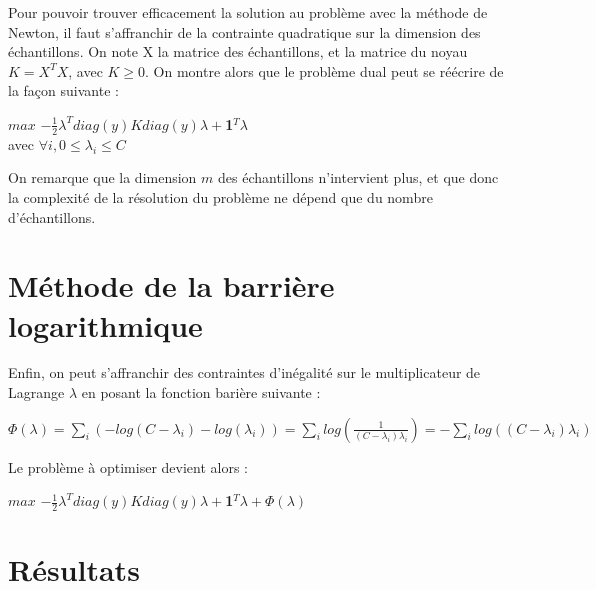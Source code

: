 \documentclass{article}
\begin{document}
Pour pouvoir trouver efficacement la solution au problème avec la méthode de Newton, il faut s'affranchir de la contrainte quadratique sur la dimension des échantillons. On note X la matrice des échantillons, et la matrice du noyau $K = X^TX$, avec $K \geq 0$. On montre alors que le problème dual peut se réécrire de la façon suivante :\\

                 \begin{center}
                 $max$ $-\frac{1}{2}\lambda^Tdiag(y)Kdiag(y)\lambda+$\textbf{1}$^T\lambda$\\
                 avec $\forall i, 0 \leq \lambda_i \leq C$ 
                 \end{center}

On remarque que la dimension $m$ des échantillons n'intervient plus, et que donc la complexité de la résolution du problème ne dépend que du nombre d'échantillons. 

\section{Méthode de la barrière logarithmique}

Enfin, on peut s'affranchir des contraintes d'inégalité sur le multiplicateur de Lagrange $\lambda$ en posant la fonction barière suivante :\\

          \begin{center}
          $\Phi(\lambda) = \sum_i (- log(C - \lambda_i) - log(\lambda_i)) = \sum_i log(\frac{1}{(C - \lambda_i)\lambda_i}) = - \sum_i log((C - \lambda_i)\lambda_i)$ 
          \end{center}

Le problème à optimiser devient alors :\\

          \begin{center}
          $max$ $-\frac{1}{2}\lambda^Tdiag(y)Kdiag(y)\lambda+$\textbf{1}$^T\lambda + \Phi(\lambda)$\\ 
          \end{center}

\section{Résultats}
\end{document}
